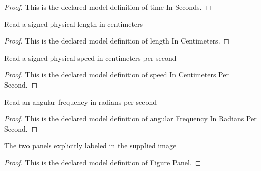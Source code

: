 \begin{proof}
  This is the declared model definition of time In Seconds.
\end{proof}
\begin{definition}
  \label{def:physics:phyx-mini-0254:phyxminiproblems-problemphyxmini0254-lengthincentimeters}
  Read a signed physical length in centimeters
\end{definition}
\begin{proof}
  This is the declared model definition of length In Centimeters.
\end{proof}
\begin{definition}
  \label{def:physics:phyx-mini-0254:phyxminiproblems-problemphyxmini0254-speedincentimeterspersecond}
  Read a signed physical speed in centimeters per second
\end{definition}
\begin{proof}
  This is the declared model definition of speed In Centimeters Per Second.
\end{proof}
\begin{definition}
  \label{def:physics:phyx-mini-0254:phyxminiproblems-problemphyxmini0254-angularfrequencyinradianspersecond}
  Read an angular frequency in radians per second
\end{definition}
\begin{proof}
  This is the declared model definition of angular Frequency In Radians Per Second.
\end{proof}
\begin{definition}
  \label{def:physics:phyx-mini-0254:phyxminiproblems-problemphyxmini0254-figurepanel}
  The two panels explicitly labeled in the supplied image
\end{definition}
\begin{proof}
  This is the declared model definition of Figure Panel.
\end{proof}
